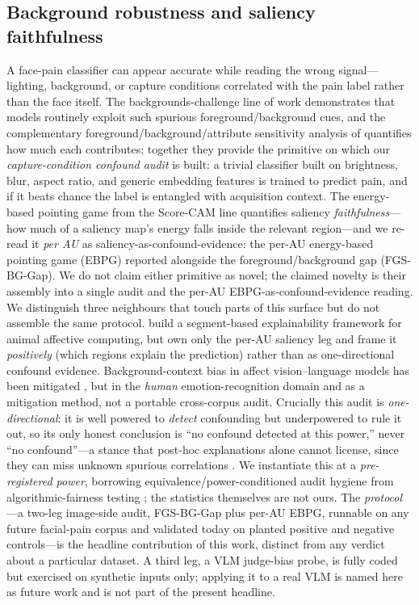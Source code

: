 \subsection{Background robustness and saliency faithfulness}
\label{subsec:bg-robustness}

A face-pain classifier can appear accurate while reading the wrong signal---
lighting, background, or capture conditions correlated with the pain label
rather than the face itself. The backgrounds-challenge line of work
\cite{xiao2021noise} demonstrates that models routinely
exploit such spurious foreground/background cues, and the complementary
foreground/background/attribute sensitivity analysis of
\cite{moayeri2022comprehensive} quantifies how much each contributes; together
they provide the primitive on which our
\emph{capture-condition confound audit} is built: a trivial classifier built on
brightness, blur, aspect ratio, and generic embedding features is trained to
predict pain, and if it beats chance the label is entangled with acquisition
context. The energy-based pointing game from the Score-CAM line
\cite{wang2020scorecam} quantifies saliency \emph{faithfulness}---how much of a
saliency map's energy falls inside the relevant region---and we re-read it
\emph{per AU} as saliency-as-confound-evidence: the per-AU energy-based pointing
game (EBPG) reported alongside the foreground/background gap (FGS-BG-Gap). We do
not claim either primitive as novel; the claimed novelty is their assembly into a
single audit and the per-AU EBPG-as-confound-evidence reading. We
distinguish three neighbours that touch parts of this surface but do not
assemble the same protocol. \textcite{lencioni2025segment} build a segment-based
explainability framework for animal affective computing, but own only the per-AU
saliency leg and frame it \emph{positively} (which regions explain the
prediction) rather than as one-directional confound evidence.
Background-context bias in affect vision--language models has been mitigated
\cite{context2025becki}, but in the \emph{human} emotion-recognition domain and
as a mitigation method, not a portable cross-corpus audit. Crucially this audit
is \emph{one-directional}: it is well powered to \emph{detect} confounding but
underpowered to rule it out, so its only honest conclusion is \enquote{no
confound detected at this power,} never \enquote{no confound}---a stance that
post-hoc explanations alone cannot license, since they can miss unknown spurious
correlations \cite{adebayo2022posthoc}. We instantiate this at a
\emph{pre-registered power}, borrowing equivalence/power-conditioned audit
hygiene from algorithmic-fairness testing
\cite{huanghooker2026fairness,singh2023samplesize}; the statistics themselves are
not ours. The
\emph{protocol}---a two-leg image-side audit, FGS-BG-Gap plus per-AU EBPG,
runnable on any future facial-pain corpus and validated today on planted positive
and negative controls---is the headline contribution of this work, distinct from
any verdict about a particular dataset. A third leg, a VLM judge-bias probe, is
fully coded but exercised on synthetic inputs only; applying it to a real VLM is
named here as future work and is not part of the present headline.

